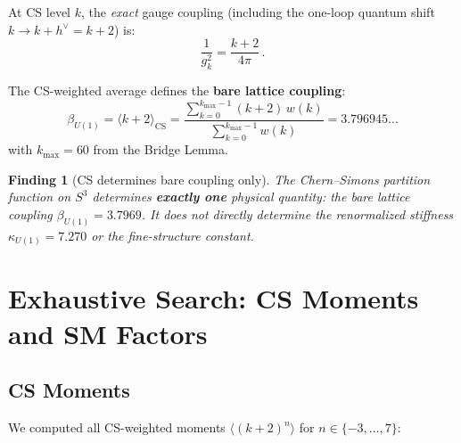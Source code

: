 \documentclass[12pt,a4paper]{article}
\newtheorem{finding}{Finding}
\theoremstyle{definition}
\theoremstyle{remark}
\begin{document}
At CS level $k$, the \emph{exact} gauge coupling (including the one-loop
quantum shift $k \to k + h^\vee = k + 2$) is:
\begin{equation}
\frac{1}{g_k^2} = \frac{k + 2}{4\pi}\,.
\end{equation}

The CS-weighted average defines the \textbf{bare lattice coupling}:
\begin{equation}
\beta_{U(1)} = \langle k+2 \rangle_{\mathrm{CS}}
= \frac{\sum_{k=0}^{k_{\max}-1}(k+2)\,w(k)}
       {\sum_{k=0}^{k_{\max}-1}w(k)}
= 3.796945\ldots
\end{equation}
with $k_{\max} = 60$ from the Bridge Lemma.

\begin{finding}[CS determines bare coupling only]
\label{find:CS-bare}
The Chern--Simons partition function on $S^3$ determines \textbf{exactly one}
physical quantity: the bare lattice coupling $\beta_{U(1)} = 3.7969$.
It does \emph{not} directly determine the renormalized stiffness
$\kappa_{U(1)} = 7.270$ or the fine-structure constant.
\end{finding}

\section{Exhaustive Search: CS Moments and SM Factors}
\label{sec:search}

\subsection{CS Moments}

We computed all CS-weighted moments $\langle (k+2)^n \rangle$ for
$n \in \{-3, \ldots, 7\}$:
\end{document}
